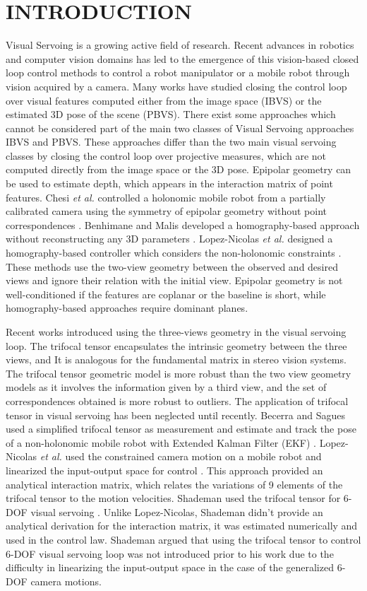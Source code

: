 \section{INTRODUCTION}
Visual Servoing is a growing active field of research. Recent advances in robotics and computer vision domains has led to the emergence of this vision-based closed loop control methods to control a robot manipulator or a mobile robot through vision acquired by a camera. Many works have studied closing the control loop over visual features computed either from the image space (IBVS) or the estimated 3D pose of the scene (PBVS). There exist some approaches which cannot be considered part of the main two classes of Visual Servoing approaches IBVS and PBVS. These approaches differ than the two main visual servoing classes by closing the control loop over projective measures, which are not computed directly from the image space or the 3D pose. Epipolar geometry can be used to estimate depth, which appears in the interaction matrix of point features\cite{malis20002}. Chesi \textit{et al.} controlled a holonomic mobile robot from a partially calibrated camera using the symmetry of epipolar geometry without point correspondences \cite{chesi}. Benhimane and Malis developed a homography-based approach without reconstructing any 3D parameters \cite{Malis}. Lopez-Nicolas \textit{et al.} designed a homography-based controller which considers the non-holonomic constraints \cite{lopez2006}. These methods use the two-view geometry between the observed and desired views and ignore their relation with the initial view. Epipolar geometry is not well-conditioned if the features are coplanar or the baseline is short, while homography-based approaches require dominant planes.

Recent works introduced using the three-views geometry in the visual servoing loop. The trifocal tensor encapsulates the intrinsic geometry between the three views, and It is analogous for the fundamental matrix in stereo vision systems. The trifocal tensor geometric model is more robust than the two view geometry models as it involves the information given by a third view, and the set of correspondences obtained is more robust to outliers. The application of trifocal tensor in visual servoing has been neglected until recently. Becerra and Sagues used a simplified trifocal tensor as measurement and estimate and track the pose of a non-holonomic mobile robot with Extended Kalman Filter (EKF) \cite{becerra2009pose}. Lopez-Nicolas \textit{et al.} used the constrained camera motion on a mobile robot and linearized the input-output space for control \cite{lopez2010visual}. This approach provided an analytical interaction matrix, which relates the variations of 9 elements of the trifocal tensor to the motion velocities. Shademan used the trifocal tensor for 6-DOF visual servoing \cite{shademan2010three}. Unlike Lopez-Nicolas, Shademan didn't provide an analytical derivation for the interaction matrix, it was estimated numerically and used in the control law. Shademan argued that using the trifocal tensor to control 6-DOF visual servoing loop was not introduced prior to his work due to the difficulty in linearizing the input-output space in the case of the generalized 6-DOF camera motions.

